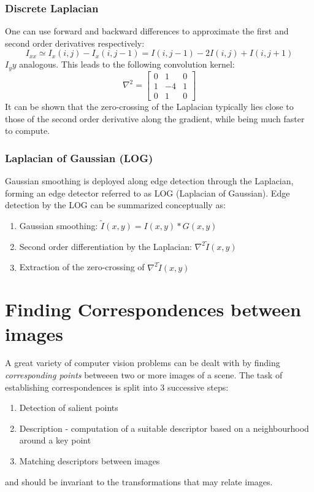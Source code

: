 \documentclass{article}
\begin{document}
\subsubsection{Discrete Laplacian}
One can use forward and backward differences to approximate the first and second order derivatives respectively:
\[
    I_{xx} \simeq I_x(i,j)-I_x(i,j-1)=I(i,j-1) - 2I(i,j)+I(i,j+1)
\]
$I_yy$ analogous. This leads to the following convolution kernel:
\[
    \nabla^2 = \begin{bmatrix}
        0 & 1  & 0 \\
        1 & -4  & 1 \\
        0 & 1  & 0 
    \end{bmatrix}
\]
It can be shown that the zero-crossing of the Laplacian typically lies close to those of the second order derivative along the gradient, while being much faster to compute. 
\subsubsection{Laplacian of Gaussian (LOG)}
Gaussian smoothing is deployed along edge detection through the Laplacian, forming an edge detector referred to as LOG (Laplacian of Gaussian). Edge detection by the LOG can be summarized conceptually as:
\begin{enumerate}
    \item Gaussian smoothing: $\tilde{I}(x,y) = I(x,y) \ast G(x,y)$ 
    \item Second order differentiation by the Laplacian: $\nabla^2\tilde{I}(x,y)$
    \item Extraction of the zero-crossing of $\nabla^2\tilde{I}(x,y)$ 
\end{enumerate}
\section{Finding Correspondences between images}
A great variety of computer vision problems can be dealt with by finding \emph{corresponding points} betweeen two or more images of a scene. The task of establishing correspondences is split into 3 successive steps: 
\begin{enumerate}
    \item Detection of salient points
    \item Description - computation of a suitable descriptor based on a neighbourhood around a key point 
    \item Matching descriptors between images
\end{enumerate}
and should be invariant to the transformations that may relate images. 
\end{document}
